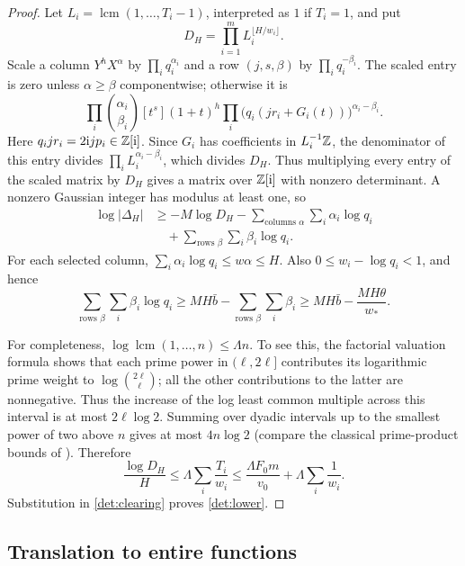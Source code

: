 \begin{proof}
Let $L_i=\operatorname{lcm}(1,\ldots,T_i-1)$, interpreted as $1$ if
$T_i=1$, and put
\[
 D_H=\prod_{i=1}^m L_i^{\lfloor H/w_i\rfloor}.
\]
Scale a column $Y^hX^\alpha$ by $\prod_iq_i^{\alpha_i}$ and a row
$(j,s,\beta)$ by $\prod_iq_i^{-\beta_i}$.  The scaled entry is zero
unless $\alpha\ge\beta$ componentwise; otherwise it is
\[
 \prod_i\binom{\alpha_i}{\beta_i}
 [t^s](1+t)^h
 \prod_i\bigl(q_i(jr_i+G_i(t))\bigr)^{\alpha_i-\beta_i}.
\]
Here $q_ijr_i=2\mathrm i jp_i\in\mathbb Z[\mathrm i]$.  Since $G_i$ has coefficients in
$L_i^{-1}\mathbb Z$, the denominator of this entry divides
$\prod_iL_i^{\alpha_i-\beta_i}$, which divides $D_H$.  Thus multiplying
every entry of the scaled matrix by $D_H$ gives a matrix over
$\mathbb Z[\mathrm i]$ with nonzero determinant.  A nonzero Gaussian integer has
modulus at least one, so
\begin{equation}
 \begin{aligned}
 \log|\Delta_H|
 &\ge -M\log D_H
      -\sum_{\text{columns }\alpha}\sum_i\alpha_i\log q_i\\
 &\quad+\sum_{\text{rows }\beta}\sum_i\beta_i\log q_i.
 \end{aligned}
 \label{det:clearing}
\end{equation}
For each selected column, $\sum_i\alpha_i\log q_i\le w\alpha\le H$.
Also $0\le w_i-\log q_i<1$, and hence
\[
 \sum_{\text{rows }\beta}\sum_i\beta_i\log q_i
 \ge MH\bar b-\sum_{\text{rows }\beta}\sum_i\beta_i
 \ge MH\bar b-\frac{MH\theta}{w_*}.
\]

For completeness, $\log\operatorname{lcm}(1,\ldots,n)\le\Lambda n$.
To see this, the factorial valuation formula shows that each prime
power in $(\ell,2\ell]$ contributes its logarithmic prime weight to
$\log\binom{2\ell}{\ell}$; all the other contributions to the latter
are nonnegative.  Thus the increase of the log least common multiple
across this interval is at most $2\ell\log2$.  Summing over dyadic
intervals up to the smallest power of two above $n$ gives at most
$4n\log2$ (compare the classical prime-product bounds of \cite{chebyshev1852,hanson1972}).  Therefore
\[
 \frac{\log D_H}{H}
 \le\Lambda\sum_i\frac{T_i}{w_i}
 \le\frac{\Lambda F_0m}{v_0}+\Lambda\sum_i\frac1{w_i}.
\]
Substitution in \eqref{det:clearing} proves \eqref{det:lower}.
\end{proof}

\subsection{Translation to entire functions}

